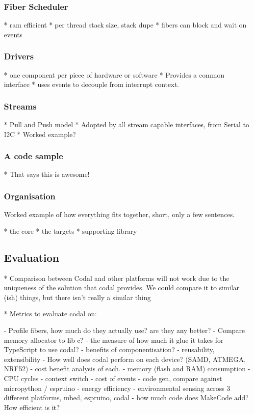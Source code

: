 \subsubsection{Fiber Scheduler}

* ram efficient
* per thread stack size, stack dupe
* fibers can block and wait on events

\subsubsection{Drivers}

* one component per piece of hardware or software
* Provides a common interface
* uses events to decouple from interrupt context.

\subsubsection{Streams}

* Pull and Push model
* Adopted by all stream capable interfaces, from Serial to I2C
* Worked example?

\subsubsection{A code sample}

* That says this is awesome!

\subsubsection{Organisation}

Worked example of how everything fits together, short, only a few sentences.

* the core
* the targets
* supporting library


\subsection{Evaluation}

* Comparison between Codal and other platforms will not work due to the uniqueness of the solution that codal provides. We could compare it to similar (ish) things, but there isn't really a similar thing

* Metrics to evaluate codal on:

    - Profile fibers, how much do they actually use? are they any better?
    - Compare memory allocator to lib c?
    - the measure of how much it glue it takes for TypeScript to use codal?
    - benefits of componentisation?
        - reusability, extensibility
    - How well does codal perform on each device? (SAMD, ATMEGA, NRF52)
        - cost benefit analysis of each.
        - memory (flash and RAM) consumption
        - CPU cycles
            - context switch
            - cost of events
            - code gen, compare against micropython / espruino
        - energy efficiency
            - environmental sensing across 3 different platforms, mbed, espruino, codal
        - how much code does MakeCode add? How efficient is it?


